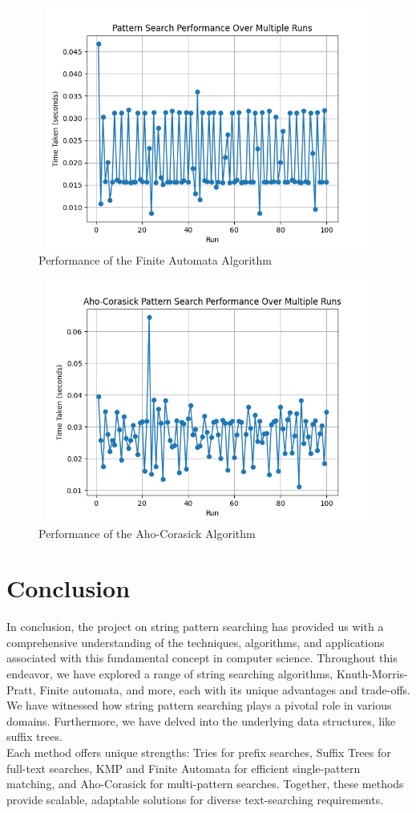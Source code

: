 \documentclass[11pt,a4paper]{article}
\begin{document}
\begin{figure}[H]
    \centering
    \includegraphics[width=12cm, height=8cm]{time_FA.png}
    \caption{Performance of the Finite Automata Algorithm}
\end{figure}

\begin{figure}[H]
    \centering
    \includegraphics[width=12cm, height=8cm]{time_modifiedTrie.png}
    \caption{Performance of the Aho-Corasick Algorithm}
\end{figure}

    
\section{Conclusion}
\label{sec:conc}
In conclusion, the project on string pattern searching has provided us with a comprehensive understanding of the techniques, algorithms, and applications associated with this fundamental concept in computer science. Throughout this endeavor, we have explored a range of string searching algorithms, Knuth-Morris-Pratt, Finite automata, and more, each with its unique advantages and trade-offs. We have witnessed how string pattern searching plays a pivotal role in various domains. Furthermore, we have delved into the underlying data structures, like suffix trees. \\
Each method offers unique strengths: Tries for prefix searches, Suffix Trees for full-text searches, KMP and Finite Automata for efficient single-pattern matching, and Aho-Corasick for multi-pattern searches. Together, these methods provide scalable, adaptable solutions for diverse text-searching requirements.
\end{document}
